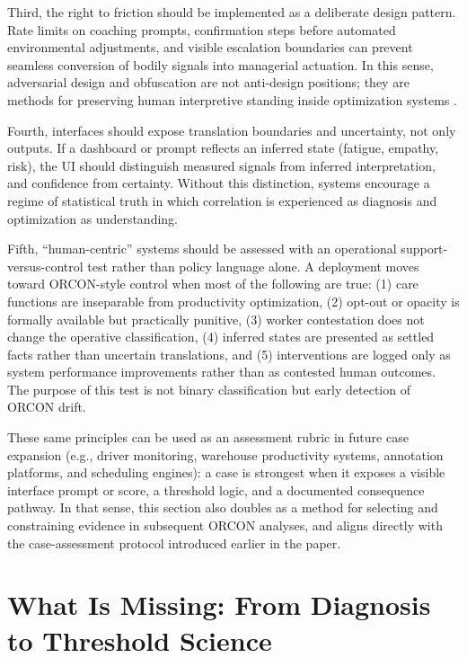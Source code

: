\documentclass[runningheads]{llncs}
\begin{document}
Third, the right to friction should be implemented as a deliberate design pattern. Rate limits on coaching prompts, confirmation steps before automated environmental adjustments, and visible escalation boundaries can prevent seamless conversion of bodily signals into managerial actuation. In this sense, adversarial design and obfuscation are not anti-design positions; they are methods for preserving human interpretive standing inside optimization systems \cite{disalvo2012adversarial,nissenbaum2015obfuscation}.

Fourth, interfaces should expose translation boundaries and uncertainty, not only outputs. If a dashboard or prompt reflects an inferred state (fatigue, empathy, risk), the UI should distinguish measured signals from inferred interpretation, and confidence from certainty. Without this distinction, systems encourage a regime of statistical truth in which correlation is experienced as diagnosis and optimization as understanding.

Fifth, ``human-centric'' systems should be assessed with an operational support-versus-control test rather than policy language alone. A deployment moves toward ORCON-style control when most of the following are true: (1) care functions are inseparable from productivity optimization, (2) opt-out or opacity is formally available but practically punitive, (3) worker contestation does not change the operative classification, (4) inferred states are presented as settled facts rather than uncertain translations, and (5) interventions are logged only as system performance improvements rather than as contested human outcomes. The purpose of this test is not binary classification but early detection of ORCON drift.

These same principles can be used as an assessment rubric in future case expansion (e.g., driver monitoring, warehouse productivity systems, annotation platforms, and scheduling engines): a case is strongest when it exposes a visible interface prompt or score, a threshold logic, and a documented consequence pathway. In that sense, this section also doubles as a method for selecting and constraining evidence in subsequent ORCON analyses, and aligns directly with the case-assessment protocol introduced earlier in the paper.

\section{What Is Missing: From Diagnosis to Threshold Science}
\end{document}
